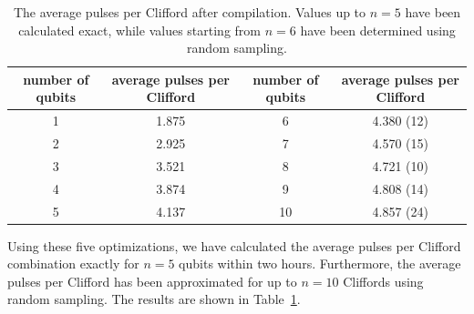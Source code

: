     \begin{table}
      \begin{tabular}{c c || c c}
        \toprule
        number of qubits  & average pulses per Clifford & number of qubits  & average pulses per Clifford \\
        \midrule
        1 & 1.875 & 6  & 4.380 (12)\\
        2 & 2.925 & 7  & 4.570 (15)\\
        3 & 3.521 & 8  & 4.721 (10)\\
        4 & 3.874 & 9  & 4.808 (14)\\
        5 & 4.137 & 10 & 4.857 (24)\\
        \bottomrule
      \end{tabular}
      \caption{The average pulses per Clifford after compilation. Values up to $n=5$ have been calculated exact, while values starting from $n=6$ have been determined using random sampling.}
      \label{tab:pulses per Clifford}
    \end{table}

    Using these five optimizations, we have calculated the average pulses per Clifford combination exactly for $n=5$ qubits within two hours. Furthermore, the average pulses per Clifford has been approximated for up to $n=10$ Cliffords using random sampling. The results are shown in Table~\ref{tab:pulses per Clifford}.
